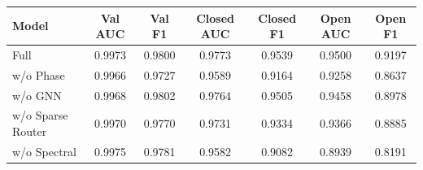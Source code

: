 \begin{tabular}{lcccccc}
\toprule
Model & Val AUC & Val F1 & Closed AUC & Closed F1 & Open AUC & Open F1 \\
\midrule
Full & 0.9973 & 0.9800 & 0.9773 & 0.9539 & 0.9500 & 0.9197 \\
w/o Phase & 0.9966 & 0.9727 & 0.9589 & 0.9164 & 0.9258 & 0.8637 \\
w/o GNN & 0.9968 & 0.9802 & 0.9764 & 0.9505 & 0.9458 & 0.8978 \\
w/o Sparse Router & 0.9970 & 0.9770 & 0.9731 & 0.9334 & 0.9366 & 0.8885 \\
w/o Spectral & 0.9975 & 0.9781 & 0.9582 & 0.9082 & 0.8939 & 0.8191 \\
\bottomrule
\end{tabular}
